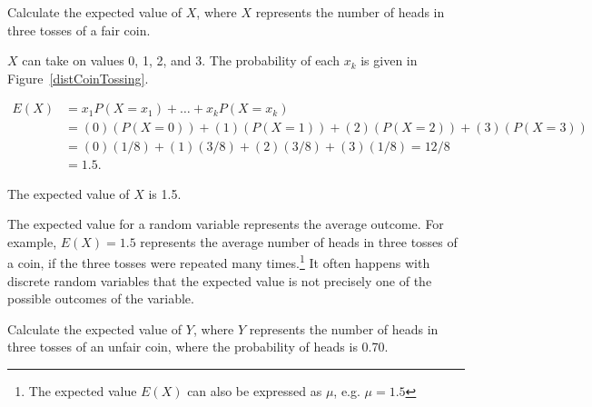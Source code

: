 \begin{examplewrap}
\begin{nexample}{Calculate the expected value of $X$, where $X$ represents the number of heads in three tosses of a fair coin.}
	
	$X$ can take on values 0, 1, 2, and 3. The probability of each $x_k$ is given in Figure~\ref{distCoinTossing}.

\begin{align*}
E(X) &= x_1 P(X = x_1) + \dots + x_k P(X = x_k)\\
&= (0)(P(X=0)) + (1)(P(X=1)) + (2)(P(X=2)) + (3)(P(X = 3)) \\
&= (0)(1/8) + (1)(3/8) + (2)(3/8) + (3)(1/8) = 12/8 \\
&= 1.5.
\end{align*}

The expected value of $X$ is 1.5.
\end{nexample}
\end{examplewrap}

The expected value for a random variable represents the average outcome. For example, $E(X)=1.5$ represents the average number of heads in three tosses of a coin, if the three tosses were repeated many times.\footnote{The expected value $E(X)$ can also be expressed as $\mu$, e.g. $\mu=1.5$}  It often happens with discrete random variables that the expected value is not precisely one of the possible outcomes of the variable.

\vspace{0mm}

\begin{exercisewrap}
\begin{nexercise}
Calculate the expected value of $Y$, where $Y$ represents the number of heads in three tosses of an unfair coin, where the probability of heads is 0.70.\footnotemark{}
\end{nexercise}
\end{exercisewrap}

